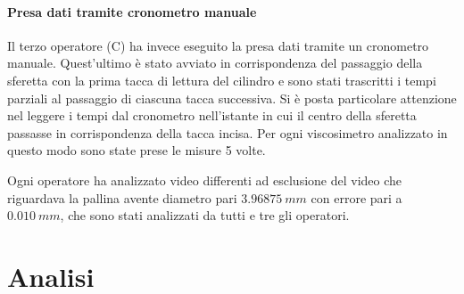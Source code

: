 \documentclass[a4paper,11pt,oneside]{article}
\begin{document}
\paragraph{Presa dati tramite cronometro manuale}
Il terzo operatore (C) ha invece eseguito la presa dati tramite un cronometro manuale. Quest'ultimo è stato avviato in corrispondenza del passaggio della sferetta con la prima tacca di lettura del cilindro e sono stati trascritti i tempi parziali al passaggio di ciascuna tacca successiva. Si è posta particolare attenzione nel leggere i tempi dal cronometro nell'istante in cui il centro della sferetta passasse in corrispondenza della tacca incisa. Per ogni viscosimetro analizzato in questo modo sono state prese le misure 5 volte.

Ogni operatore ha analizzato video differenti ad esclusione del video che riguardava la pallina avente diametro pari  $\SI {3.96875}{mm}$ con errore pari a  $\SI{0.010}{mm}$, che sono stati analizzati da tutti e tre gli operatori. 

\section{Analisi}
\end{document}
